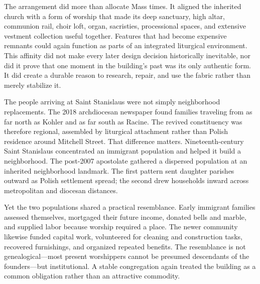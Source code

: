 
The arrangement did more than allocate Mass times. It aligned the inherited church with a form of worship that made its deep sanctuary, high altar, communion rail, choir loft, organ, sacristies, processional spaces, and extensive vestment collection useful together. Features that had become expensive remnants could again function as parts of an integrated liturgical environment. This affinity did not make every later design decision historically inevitable, nor did it prove that one moment in the building's past was its only authentic form. It did create a durable reason to research, repair, and use the fabric rather than merely stabilize it.

The people arriving at Saint Stanislaus were not simply neighborhood replacements. The 2018 archdiocesan newspaper found families traveling from as far north as Kohler and as far south as Racine. The revived constituency was therefore regional, assembled by liturgical attachment rather than Polish residence around Mitchell Street. That difference matters. Nineteenth-century Saint Stanislaus concentrated an immigrant population and helped it build a neighborhood. The post-2007 apostolate gathered a dispersed population at an inherited neighborhood landmark. The first pattern sent daughter parishes outward as Polish settlement spread; the second drew households inward across metropolitan and diocesan distances.

Yet the two populations shared a practical resemblance. Early immigrant families assessed themselves, mortgaged their future income, donated bells and marble, and supplied labor because worship required a place. The newer community likewise funded capital work, volunteered for cleaning and construction tasks, recovered furnishings, and organized repeated benefits. The resemblance is not genealogical---most present worshippers cannot be presumed descendants of the founders---but institutional. A stable congregation again treated the building as a common obligation rather than an attractive commodity.

